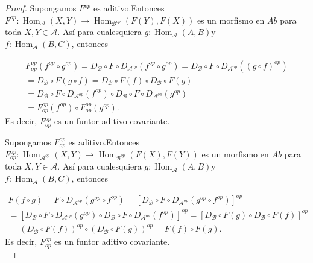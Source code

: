 \documentclass{article}
\begin{document}
\begin{enumerate}[label=\textbf{Ej \arabic*.}]
\begin{proof}
			 Supongamos $F^{op}$ es aditivo.Entonces \\$F^{op}:\operatorname{Hom}_{\mathscr{A}}(X,Y)\longrightarrow
			\operatorname{Hom}_{\mathscr{B}^{op}}(F(Y),F(X))$ es un morfismo en $Ab$ para toda $X,Y\in \mathscr{A}$. Así para cualesquiera
			$g:\operatorname{Hom}_{\mathscr{A}}(A,B)$\quad y\\
			$f:\operatorname{Hom}_{\mathscr{A}}(B,C)$, entonces
			
			\begin{gather*}
				F_{op}^{op}(f^{op}\circ g^{op})=D_{\mathscr{B}}\circ F \circ D_{\mathscr{A}^{op}}(f^{op}\circ g^{op})
				=D_{\mathscr{B}}\circ F \circ D_{\mathscr{A}^{op}}((g\circ f)^{op})\\
				=D_{\mathscr{B}}\circ F (g\circ f)=D_{\mathscr{B}}\circ F(f)\circ D_{\mathscr{B}}\circ F(g)\\
				=D_{\mathscr{B}}\circ F \circ D_{\mathscr{A}^{op}}(f^{op})\circ D_{\mathscr{B}}\circ F \circ D_{\mathscr{A}^{op}}(g^{op})\\
				=F_{op}^{op}(f^{op})\circ F_{op}^{op}(g^{op}).
			\end{gather*}
			Es decir, $F_{op}^{op}$ es un funtor aditivo covariante.
			
			 Supongamos $F_{op}^{op}$ es aditivo.Entonces \\$F_{op}^{op}:\operatorname{Hom}_{\mathscr{A}^{op}}(X,Y)\longrightarrow
			\operatorname{Hom}_{\mathscr{B}^{op}}(F(X),F(Y))$ es un morfismo en $Ab$ para toda $X,Y\in \mathscr{A}$. Así para cualesquiera
			$g:\operatorname{Hom}_{\mathscr{A}}(A,B)$\quad y\\
			$f:\operatorname{Hom}_{\mathscr{A}}(B,C)$, entonces
			
			\begin{gather*}
				F(f\circ g)=F\circ D_{\mathscr{A}^{op}}(g^{op}\circ f^{op})=[D_{\mathscr{B}}\circ F \circ D_{\mathscr{A}^{op}}(g^{op}\circ f^{op})]^{op}\\
				=[D_{\mathscr{B}}\circ F \circ D_{\mathscr{A}^{op}}(g^{op})\circ D_{\mathscr{B}}\circ F \circ D_{\mathscr{A}^{op}}(f^{op})]^{op}
				=[D_{\mathscr{B}}\circ F(g)\circ D_{\mathscr{B}}\circ F(f)]^{op}\\
				=(D_{\mathscr{B}}\circ F(f))^{op}\circ (D_{\mathscr{B}}\circ F(g))^{op}= F(f)\circ F(g).
			\end{gather*}
			Es decir, $F_{op}^{op}$ es un funtor aditivo covariante.\\
			

\end{proof}
\end{enumerate}
\end{document}
